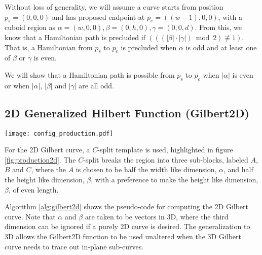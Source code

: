 Without loss of generality, we will assume a curve starts from position $p_s=(0,0,0)$ and has proposed
endpoint at $p_e=((w-1),0,0)$, with a cuboid region as $\alpha = (w,0,0), \beta = (0,h,0), \gamma = (0,0,d)$.
From this, we know that a Hamiltonian path is precluded if $( ((|\beta| \cdot |\gamma|) \bmod{2}) \not\equiv 1)$.
That is, a Hamiltonian from $p_s$ to $p_e$ is precluded when $\alpha$ is odd and at least one of $\beta$ or $\gamma$ is even.

We will show that a Hamiltonian path is possible from $p_s$ to $p_e$ when $|\alpha|$ is even or when $|\alpha|$, $|\beta|$ and $|\gamma|$
are all odd.




\subsection{2D Generalized Hilbert Function (Gilbert2D)}

\begin{figure*}[ht]
  \centering
  \texttt{[image: config\_production.pdf]}
  \caption{ Enumeration of the subdivision template depending on different parities of $\alpha$ and $\beta$ dimensions. }
  \label{fig:production2d}
\end{figure*}

For the 2D Gilbert curve, a $C$-split template is used, highlighted in figure \ref{fig:production2d}.
The $C$-split breaks the region into three sub-blocks, labeled $A$, $B$ and $C$, where the
$A$ is chosen to be half the width like dimension, $\alpha$, and half the height like dimension, $\beta$,
with a preference to make the height like dimension, $\beta$, of even length.

Algorithm \ref{alg:gilbert2d} shows the pseudo-code for computing the 2D Gilbert curve.
Note that $\alpha$ and $\beta$ are taken to be vectors in 3D, where the third dimension
can be ignored if a purely 2D curve is desired.
The generalization to 3D allows the Gilbert2D function to be used unaltered when the
3D Gilbert curve needs to trace out in-plane sub-curves.

